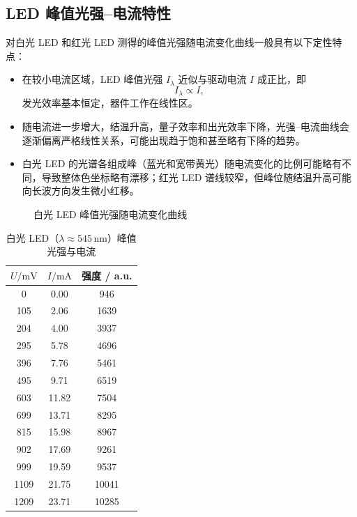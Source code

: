 \documentclass[a4paper,8pt,twocolumn]{article}
\begin{document}
\subsection{LED 峰值光强–电流特性}

对白光 LED 和红光 LED 测得的峰值光强随电流变化曲线一般具有以下定性特点：

\begin{itemize}
  \item 在较小电流区域，LED 峰值光强 $I_{\lambda}$ 近似与驱动电流 $I$ 成正比，即
  \[
    I_{\lambda} \propto I,
  \]
  发光效率基本恒定，器件工作在线性区。
  \item 随电流进一步增大，结温升高，量子效率和出光效率下降，光强–电流曲线会逐渐偏离严格线性关系，可能出现趋于饱和甚至略有下降的趋势。
  \item 白光 LED 的光谱各组成峰（蓝光和宽带黄光）随电流变化的比例可能略有不同，导致整体色坐标略有漂移；红光 LED 谱线较窄，但峰位随结温升高可能向长波方向发生微小红移。
\end{itemize}
\begin{figure}[htbp]
  \centering
  \caption{白光 LED 峰值光强随电流变化曲线}
\end{figure}
\begin{table}[H]
\centering
\caption{白光 LED（$\lambda \approx 545\,\mathrm{nm}$）峰值光强与电流}
\begin{tabular}{ccc}
\toprule
$U/\mathrm{mV}$ & $I/\mathrm{mA}$ & 强度 / a.u. \\
\midrule
0    & 0.00 & 946   \\
105  & 2.06 & 1639  \\
204  & 4.00 & 3937  \\
295  & 5.78 & 4696  \\
396  & 7.76 & 5461  \\
495  & 9.71 & 6519  \\
603  & 11.82 & 7504  \\
699  & 13.71 & 8295  \\
815  & 15.98 & 8967  \\
902  & 17.69 & 9261  \\
999  & 19.59 & 9537  \\
1109 & 21.75 & 10041 \\
1209 & 23.71 & 10285 \\
\bottomrule
\end{tabular}
\end{table}
\end{document}
